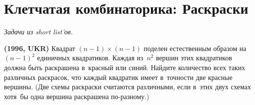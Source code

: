 

\section*{Клетчатая комбинаторика: Раскраски}


\begingroup
\providecommand\ifincludesolutions{\iffalse}


\emph{Задачи из short list'ов.}

\ifincludesolutions
\textbf{Версия с решениями.}
\emph{Решения являются слабообработанным переводом с~английского.
Beware!}
\fi

\begin{problems}

\item\textbf{(1996, UKR)}
Квадрат $(n - 1) \times (n - 1)$ поделен естественным образом на~$(n - 1)^2$
единичных квадратиков.
Каждая из~$n^2$ вершин этих квадратиков должна быть раскрашена в~красный или
синий.
Найдите количество всех таких различных раскрасок, что каждый квадратик имеет
в~точности две красные вершины.
(Две схемы раскраски считаются различными, если в~этих двух схемах хотя~бы одна
вершина раскрашена по-разному.)

\end{problems}

\ifincludesolutions
Пусть вершинам в~нижнем ряду присвоена произвольная раскраска, и~предположим,
что некоторые две смежные вершины получили одинаковый цвет.
Количетво подобных раскрасок равно $2^n-2$.
Несложно увидеть, что тогда цвета оставшихся вершин получаются заданными
единственными образом, чтобы удовлетворить требованию.
Таким образом, в~этом случае $2^n-2$ возможных раскрасок.
\par
Далее, предположим, что вершины в~нижнем ряду раскрашены попеременно в~красный и~синий.
Существует две подобных раскраски.
В~этом случае,то~же должно выполняться для каждого ряда, и~отсюда мы~получаем
$2^n$ возможных раскрасок.
\par
Отсюда следует, что полное число рассматриваемых раскрасок
$(2^n - 2) + 2^n = 2^{n+1} - 2$.
\fi %

